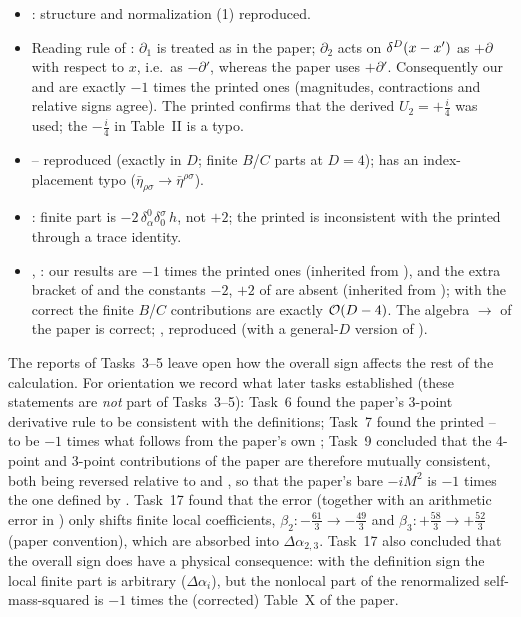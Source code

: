 \begin{discbox}
\begin{itemize}[leftmargin=1.2em,nosep]
\item {}: structure and normalization (1) reproduced.
\item Reading rule of : \(\partial_1\) is treated as in the paper; \(\partial_2\)
acts on \(\delta^D(x-x')\) as \(+\partial\) with respect to \(x\), i.e.\ as \(-\partial'\), whereas
the paper uses \(+\partial'\). Consequently our  and  are exactly
\(-1\) times the printed ones (magnitudes, contractions and relative signs agree).
The printed  confirms that the derived \(U_2=+\tfrac i4\) was used; the
\(-\tfrac i4\) in Table~II is a typo.
\item {}-- reproduced (exactly in \(D\); finite \(B\)/\(C\) parts at \(D=4\));
 has an index-placement typo (\(\bar\eta_{\rho\sigma}\to\bar\eta^{\rho\sigma}\)).
\item {}: finite part is \(-2\,\delta^0_\alpha\delta^\sigma_0\,h\), not \(+2\); the
printed  is inconsistent with the printed  through a trace identity.
\item {}, : our results are \(-1\) times the printed ones (inherited from
), and the extra bracket of  and the constants \(-2\), \(+2\) of 
are absent (inherited from ); with the correct  the finite \(B\)/\(C\)
contributions are exactly \(\mathcal{O}\!\left(D-4\right)\). The algebra \(\to\) of the
paper is correct; ,  reproduced (with a general-\(D\) version of
).
\end{itemize}
\end{discbox}

\begin{notebox}
The reports of Tasks~3--5 leave open how the overall sign affects the rest of the
calculation. For orientation we record what later tasks established (these
statements are \emph{not} part of Tasks~3--5): Task~6 found the paper's 3-point
derivative rule to be consistent with the definitions; Task~7 found the printed
-- to be \(-1\) times what follows from the paper's own ;
Task~9 concluded that the 4-point and 3-point contributions of the paper are therefore
mutually consistent, both being reversed relative to  and , so that
the paper's bare \(-iM^2\) is \(-1\) times the one defined by . Task~17 found
that the  error (together with an arithmetic error in ) only shifts
finite local coefficients, \(\beta_2:-\tfrac{61}{3}\to-\tfrac{49}{3}\) and
\(\beta_3:+\tfrac{58}{3}\to+\tfrac{52}{3}\) (paper convention), which are absorbed into
\(\Delta\alpha_{2,3}\). Task~17 also concluded that the overall sign does have a physical
consequence: with the definition sign the local finite part is arbitrary
(\(\Delta\alpha_i\)), but the nonlocal part of the renormalized self-mass-squared is
\(-1\) times the (corrected) Table~X of the paper.
\end{notebox}

